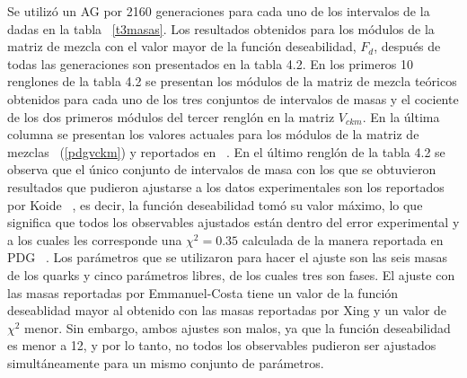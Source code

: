 Se utiliz\'o un AG por 2160 generaciones para cada uno de los intervalos de la
dadas en la tabla ~\ref{t3masas}. Los resultados obtenidos para los m\'odulos de
la matriz de mezcla con el valor mayor de la funci\'on deseabilidad, $F_d$,
despu\'es de todas las generaciones son presentados en la tabla 4.2. En los
primeros 10 renglones de la tabla 4.2 se presentan los m\'odulos de la matriz de
mezcla te\'oricos obtenidos para cada uno de los tres conjuntos de intervalos de
masas y el cociente de los dos primeros m\'odulos del tercer rengl\'on en la
matriz $V_{ckm}$. En la \'ultima columna se presentan los valores actuales para
los m\'odulos de la matriz de mezclas ~(\ref{pdgvckm}) y reportados en 
~\cite{Nak201001}. En el \'ultimo rengl\'on de la tabla 4.2 se observa que el 
\'unico conjunto de intervalos de masa con los que se obtuvieron resultados que
pudieron ajustarse a los datos experimentales son los reportados por Koide
~\cite{Fus199701}, es decir, la funci\'on deseabilidad tom\'o su valor m\'aximo,
lo que significa que todos los observables ajustados est\'an dentro del error
experimental y a los cuales les corresponde una $\chi^2=0.35$ calculada de la
manera reportada en PDG ~\cite{Nak201001}. Los par\'ametros que se utilizaron
para hacer el ajuste son las seis masas de los quarks y cinco par\'ametros
libres, de los cuales tres son fases. El ajuste con las masas reportadas por
Emmanuel-Costa tiene un valor de la funci\'on deseablidad mayor al obtenido con
las masas reportadas por Xing y un valor de $\chi^2$ menor. Sin embargo, ambos
ajustes son malos, ya que la funci\'on deseabilidad es menor a 12, y por lo
tanto, no todos los observables pudieron ser ajustados simult\'aneamente para un
mismo conjunto de par\'ametros.

